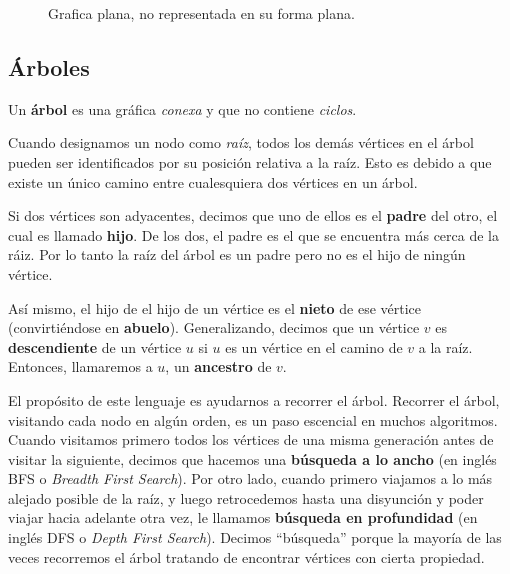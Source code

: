 \begin{figure}
  \caption{Grafica plana, no representada en su forma plana.}
\end{figure}

\subsection{\'Arboles}
\label{section:arboles}

\begin{definition}[\'Arbol]
Un \textbf{\'arbol} es una gr\'afica \emph{conexa} y que no contiene \emph{ciclos}.
\end{definition}

Cuando designamos un nodo como \emph{ra\'iz}, todos los dem\'as v\'ertices en el \'arbol pueden ser identificados por su posici\'on relativa a la ra\'iz. Esto es debido a que existe un \'unico camino entre cualesquiera dos v\'ertices en un \'arbol.

Si dos vértices son adyacentes, decimos que uno de ellos es el \textbf{padre} del otro, el cual es llamado \textbf{hijo}. De los dos, el padre es el que se encuentra m\'as cerca de la r\'aiz. Por lo tanto la ra\'iz del \'arbol es un padre pero no es el hijo de ning\'un v\'ertice.

As\'i mismo, el hijo de el hijo de un v\'ertice es el \textbf{nieto} de ese v\'ertice (convirti\'endose en \textbf{abuelo}). Generalizando, decimos que un v\'ertice $v$ es \textbf{descendiente} de un v\'ertice $u$ si $u$ es un v\'ertice en el camino de $v$ a la ra\'iz. Entonces, llamaremos a $u$, un \textbf{ancestro} de $v$.

El propósito de este lenguaje es ayudarnos a recorrer el árbol. Recorrer el árbol, visitando cada nodo en algún orden, es un paso escencial en muchos algoritmos. Cuando visitamos primero todos los vértices de una misma generación antes de visitar la siguiente, decimos que hacemos una \textbf{b\'usqueda a lo ancho} (en inglés BFS o \textit{Breadth First Search}). Por otro lado, cuando primero viajamos a lo más alejado posible de la raíz, y luego retrocedemos hasta una disyunción y poder viajar hacia adelante otra vez, le llamamos \textbf{b\'usqueda en profundidad} (en inglés DFS o \textit{Depth First Search}). Decimos ``b\'usqueda'' porque la mayoría de las veces recorremos el árbol tratando de encontrar vértices con cierta propiedad.

